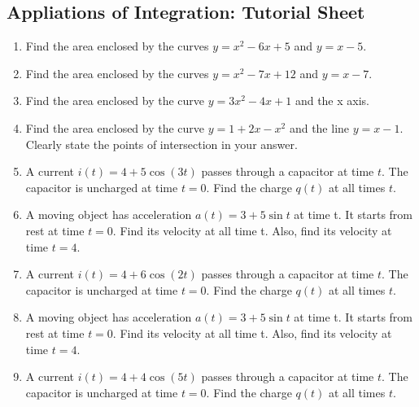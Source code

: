 \documentclass[a4paper,12pt]{article}
\begin{document}
\subsection*{Appliations of Integration: Tutorial Sheet}

\begin{enumerate}
	\item  Find the area enclosed by the curves $y=x^2-6x+5$ and $y=x-5$.
\item  Find the area enclosed by the curves $y=x^2-7x+12$ and $y=x-7$.
	\item  Find the area enclosed by the curve $y = 3x^2 - 4x + 1$ and the x axis.
		\item Find the area enclosed by the curve $y=1+2x-x^2$ and the line $y=x-1$.
	Clearly state the points of intersection in your answer.
	\item  A current $i(t) = 4 + 5\cos(3t)$ passes through a capacitor at time $t$.
	The capacitor is uncharged at time $ t = 0 $. Find the charge $q(t)$ at all times $t$.
	\item  A moving object has acceleration $a(t) = 3 + 5 \sin t$ at time t. It starts from rest at time $t = 0$. Find its velocity at all time t.	Also, find its velocity at time $t = 4$.


\item A current $i(t) = 4 + 6\cos(2t)$ passes through a capacitor at time $t$.
The capacitor is uncharged at time $ t = 0 $. Find the charge $q(t)$ at all times $t$.
\item A moving object has acceleration
$a(t) = 3 + 5 \sin t$ at time t. It starts from rest at time $t = 0$. Find its velocity at all time t.
Also, find its velocity at time $t = 4$.

	\item A current $i(t) = 4 + 4\cos(5t)$ passes through a capacitor at time $t$.
	The capacitor is uncharged at time $ t = 0 $. Find the charge $q(t)$ at all times $t$.




\end{enumerate}
\end{document}
